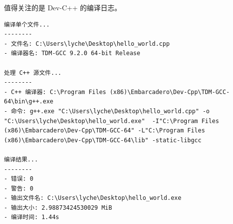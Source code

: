 值得关注的是 Dev-C++ 的编译日志。

\begin{lstlisting}[language={}]
编译单个文件...
--------
- 文件名: C:\Users\lyche\Desktop\hello_world.cpp
- 编译器名: TDM-GCC 9.2.0 64-bit Release

处理 C++ 源文件...
--------
- C++ 编译器: C:\Program Files (x86)\Embarcadero\Dev-Cpp\TDM-GCC-64\bin\g++.exe
- 命令: g++.exe "C:\Users\lyche\Desktop\hello_world.cpp" -o "C:\Users\lyche\Desktop\hello_world.exe"  -I"C:\Program Files (x86)\Embarcadero\Dev-Cpp\TDM-GCC-64" -L"C:\Program Files (x86)\Embarcadero\Dev-Cpp\TDM-GCC-64\lib" -static-libgcc

编译结果...
--------
- 错误: 0
- 警告: 0
- 输出文件名: C:\Users\lyche\Desktop\hello_world.exe
- 输出大小: 2.98873424530029 MiB
- 编译时间: 1.44s
\end{lstlisting}
